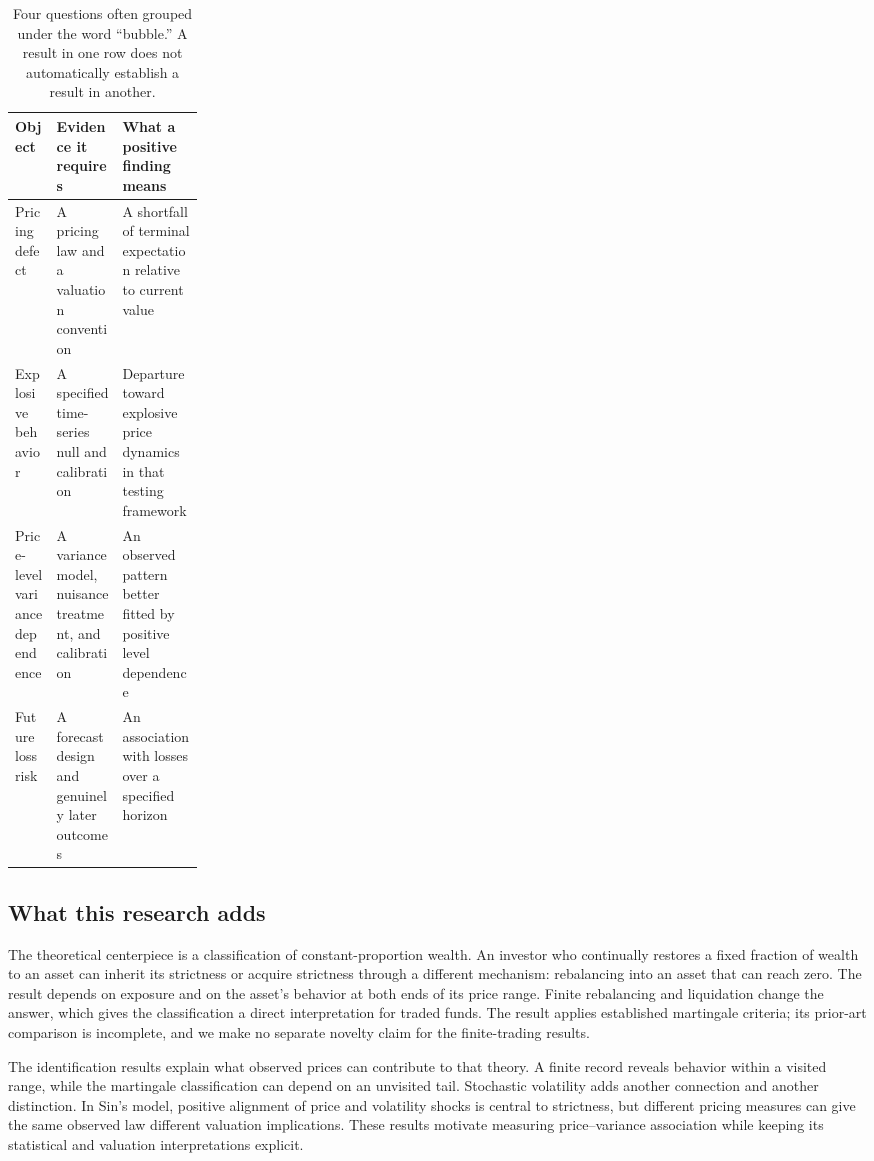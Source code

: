\begin{table}[htbp]
\centering\small
\begin{tabularx}{\linewidth}{@{}L{0.22\linewidth}YY@{}}
\toprule
Object & Evidence it requires & What a positive finding means \\
\midrule
Pricing defect & A pricing law and a valuation convention & A shortfall of
terminal expectation relative to current value \\
Explosive behavior & A specified time-series null and calibration & Departure
toward explosive price dynamics in that testing framework \\
Price-level variance dependence & A variance model, nuisance treatment, and
calibration & An observed pattern better fitted by positive level dependence \\
Future loss risk & A forecast design and genuinely later outcomes & An
association with losses over a specified horizon \\
\bottomrule
\end{tabularx}
\caption{Four questions often grouped under the word ``bubble.'' A result in
one row does not automatically establish a result in another.}
\label{tab:objects}
\end{table}

\subsection{What this research adds}
The theoretical centerpiece is a classification of constant-proportion
wealth. An investor who continually restores a fixed fraction of wealth
to an asset can inherit its strictness or acquire strictness through a
different mechanism: rebalancing into an asset that can reach zero.
The result depends on exposure and on the asset's behavior at both ends
of its price range. Finite rebalancing and liquidation change the answer,
which gives the classification a direct interpretation for traded funds.
The result applies established martingale criteria; its prior-art comparison
is incomplete, and we make no separate novelty claim for the finite-trading
results.

The identification results explain what observed prices can contribute to
that theory. A finite record reveals behavior within a visited range, while
the martingale classification can depend on an unvisited tail. Stochastic
volatility adds another connection and another distinction. In Sin's model,
positive alignment of price and volatility shocks is central to strictness,
but different pricing measures can give the same observed law different
valuation implications. These results motivate measuring price--variance
association while keeping its statistical and valuation interpretations
explicit.

